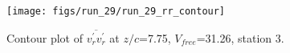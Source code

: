 \begin{figure}[H]
\centering
\texttt{[image: figs/run\_29/run\_29\_rr\_contour]}
\caption{Contour plot of $\overline{v_{r}^{\prime} v_{r}^{\prime}}$ at $z/c$=7.75, $V_{free}$=31.26, station 3.}
\label{fig:run_29_rr_contour}
\end{figure}


